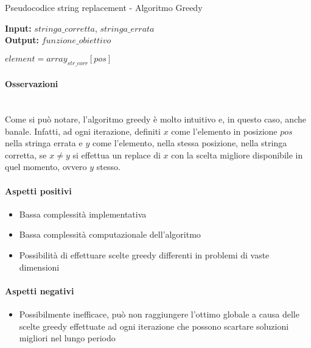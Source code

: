 \begin{algorithm}[!h]
    \captionsetup{labelformat=empty}
    \caption{Pseudocodice string replacement - Algoritmo Greedy}
    \vspace{0.1cm}
    \hspace*{\algorithmicindent} \textbf{Input:} {$stringa\_corretta$}, {$stringa\_errata$}\\
    \hspace*{\algorithmicindent} \textbf{Output:} {$funzione\_obiettivo$}
    \begin{algorithmic}[1]
                \State $element = array_{str\_corr}[pos]$
            \EndIf
        \EndFor
        \State {}
        \EndProcedure
    \end{algorithmic}
\end{algorithm}

\noindent \paragraph{Osservazioni}\hfill\\
Come si può notare, l'algoritmo greedy è molto intuitivo e, in questo caso,
anche banale.
Infatti, ad ogni iterazione, definiti $x$ come l'elemento in posizione $pos$ nella
stringa errata e $y$ come l'elemento, nella stessa posizione, nella stringa corretta,
se $x \neq y$ si effettua un replace di $x$ con la scelta migliore disponibile
in quel momento, ovvero $y$ stesso.

\noindent \paragraph{Aspetti positivi}
\begin{itemize}
    \item Bassa complessità implementativa
    \item Bassa complessità computazionale dell'algoritmo
    \item Possibilità di effettuare scelte greedy differenti in problemi di vaste dimensioni
\end{itemize}
\noindent \paragraph{Aspetti negativi}
\begin{itemize}
    \item Possibilmente inefficace, può non raggiungere l'ottimo globale a causa
    delle scelte greedy effettuate ad ogni iterazione che possono scartare soluzioni
    migliori nel lungo periodo
\end{itemize}
